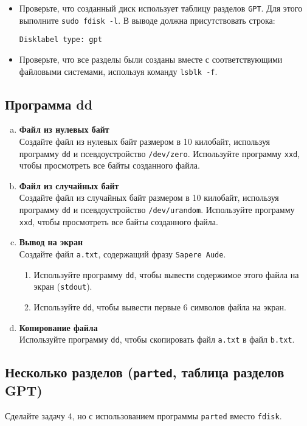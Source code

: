 \documentclass{article}
\begin{document}
\begin{itemize}
\item Проверьте, что созданный диск использует таблицу разделов \texttt{GPT}. Для этого выполните \texttt{sudo fdisk -l}. В выводе должна присутствовать строка:
\begin{lstlisting}
Disklabel type: gpt
\end{lstlisting}
\item Проверьте, что все разделы были созданы вместе с соответствующими файловыми системами, используя команду \texttt{lsblk -f}.
\end{itemize}

\subsection{Программа dd}

\begin{enumerate}[a.]
\item \textbf{Файл из нулевых байт}\\
Создайте файл из нулевых байт размером в 10 килобайт, используя программу \texttt{dd} и псевдоустройство \texttt{/dev/zero}. Используйте программу \texttt{xxd}, чтобы просмотреть все байты созданного файла.

\item \textbf{Файл из случайных байт}\\
Создайте файл из случайных байт размером в 10 килобайт, используя программу \texttt{dd} и псевдоустройство \texttt{/dev/urandom}. Используйте программу \texttt{xxd}, чтобы просмотреть все байты созданного файла.

\item \textbf{Вывод на экран}\\
Создайте файл \texttt{a.txt}, содержащий фразу \texttt{Sapere Aude}.
\begin{enumerate}
\item Используйте программу \texttt{dd}, чтобы вывести содержимое этого файла на экран (\texttt{stdout}).
\item Используйте \texttt{dd}, чтобы вывести первые 6 символов файла на экран.
\end{enumerate}

\item \textbf{Копирование файла}\\
Используйте программу \texttt{dd}, чтобы скопировать файл \texttt{a.txt} в файл \texttt{b.txt}.
\end{enumerate}


\subsection{Несколько разделов (\texttt{parted}, таблица разделов GPT)}
Сделайте задачу 4, но с использованием программы \texttt{parted} вместо \texttt{fdisk}.


\iffalse
\newpage
~
\newpage

\subsection*{Идеи}
\begin{itemize}
\item Вопросы по ext2
\begin{itemize}
\item Сколько памяти может занимать 1 файл в ext2 (block=4kb, размер указателя = 4 или 8).
\end{itemize}
\end{itemize}


\fi
\end{document}
